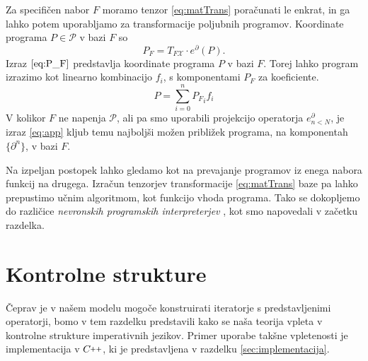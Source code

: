 \documentclass[a4paper, 12pt]{book}
\newcommand{\X}{\mathcal{X}}
\newcommand{\CC}{C\nolinebreak\hspace{-.05em}\raisebox{.4ex}{\tiny\bf +}\nolinebreak\hspace{-.10em}\raisebox{.4ex}{\tiny\bf +}}
\def\CC{{C\nolinebreak[4]\hspace{-.05em}\raisebox{.4ex}{\tiny\bf ++}}}
\newcommand{\dP}{\mathcal{P}}
\newcommand{\D}{\partial}
\begin{document}
Za specifičen nabor $F$ moramo tenzor \eqref{eq:matTrans} poračunati le enkrat, in ga lahko potem uporabljamo za transformacije poljubnih programov. Koordinate programa $P\in\dP$ v bazi $F$ so
\begin{equation}\label{eq:P_F}
  	P_F=T_{F\X}\cdot e^\D(P).
  \end{equation}
Izraz $\eqref{eq:P_F}$ predstavlja koordinate programa $P$ v bazi $F$. Torej lahko program izrazimo kot linearno kombinacijo $f_i$, s komponentami $P_F$ za koeficiente.
  \begin{equation}\label{eq:app}
  P=\sum\limits_{i=0}^{n}{P_F}_if_i
  \end{equation}
  V kolikor $F$ ne napenja $\dP$, ali pa smo uporabili projekcijo operatorja $e^\D_{n<N}$, je izraz \eqref{eq:app} kljub temu najboljši možen približek programa, na komponentah $\{\D^n\}$, v bazi $F$.

Na izpeljan postopek lahko gledamo kot na prevajanje programov iz enega nabora funkcij na drugega. Izračun tenzorjev transformacije \eqref{eq:matTrans} baze pa lahko prepustimo učnim algoritmom, kot funkcijo vhoda programa. Tako se dokopljemo do različice \emph{nevronskih programskih interpreterjev} \cite{progInterp}, kot smo napovedali v začetku razdelka.
 
\section{Kontrolne strukture}

Čeprav je v našem modelu mogoče konstruirati iteratorje s predstavljenimi operatorji, bomo v tem razdelku predstavili kako se naša teorija vpleta v kontrolne strukture imperativnih jezikov. Primer uporabe takšne vpletenosti je implementacija v $\CC$, ki je predstavljena v razdelku \ref{sec:implementacija}.
\end{document}

